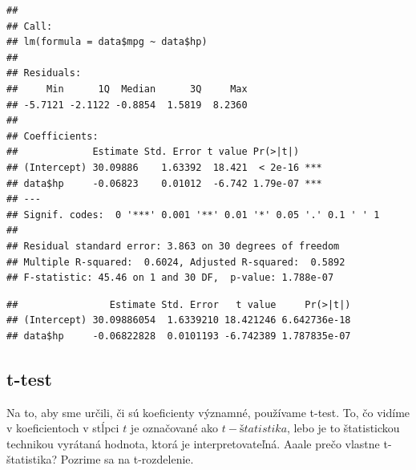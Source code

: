 \begin{verbatim}
## 
## Call:
## lm(formula = data$mpg ~ data$hp)
## 
## Residuals:
##     Min      1Q  Median      3Q     Max 
## -5.7121 -2.1122 -0.8854  1.5819  8.2360 
## 
## Coefficients:
##             Estimate Std. Error t value Pr(>|t|)    
## (Intercept) 30.09886    1.63392  18.421  < 2e-16 ***
## data$hp     -0.06823    0.01012  -6.742 1.79e-07 ***
## ---
## Signif. codes:  0 '***' 0.001 '**' 0.01 '*' 0.05 '.' 0.1 ' ' 1
## 
## Residual standard error: 3.863 on 30 degrees of freedom
## Multiple R-squared:  0.6024, Adjusted R-squared:  0.5892 
## F-statistic: 45.46 on 1 and 30 DF,  p-value: 1.788e-07
\end{verbatim}

\begin{Shaded}
\begin{Highlighting}[]

\OperatorTok{$}
\end{Highlighting}
\end{Shaded}

\begin{verbatim}
##                Estimate Std. Error   t value     Pr(>|t|)
## (Intercept) 30.09886054  1.6339210 18.421246 6.642736e-18
## data$hp     -0.06822828  0.0101193 -6.742389 1.787835e-07
\end{verbatim}

\hypertarget{t-test}{%
\subsection{t-test}\label{t-test}}

Na to, aby sme určili, či sú koeficienty významné, používame t-test. To,
čo vidíme v koeficientoch v stĺpci \(t\) je označované ako
\(t-štatistika\), lebo je to štatistickou technikou vyrátaná hodnota,
ktorá je interpretovateľná. Aaale prečo vlastne t-štatistika? Pozrime sa
na t-rozdelenie.

